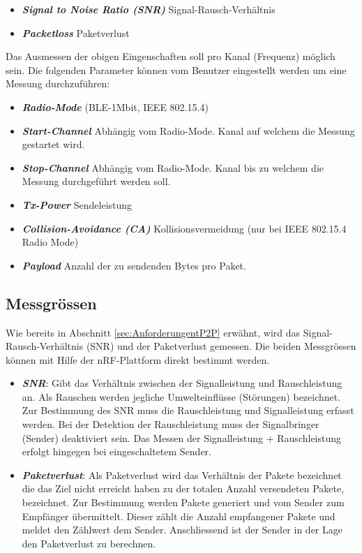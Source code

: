 \begin{itemize}
	\item \textit{\textbf{Signal to Noise Ratio (SNR)}} Signal-Rausch-Verhältnis 
	\item \textit{\textbf{Packetloss}} Paketverlust
\end{itemize}

Das Ausmessen der obigen Eingenschaften soll pro Kanal (Frequenz) möglich sein. Die folgenden Parameter können vom Benutzer eingestellt werden um eine Messung durchzuführen:

\begin{itemize}
	\item \textit{\textbf{Radio-Mode}} (BLE-1Mbit, IEEE 802.15.4)
	\item \textit{\textbf{Start-Channel}} Abhängig vom Radio-Mode. Kanal auf welchem die Messung gestartet wird.
	\item \textit{\textbf{Stop-Channel}} Abhängig vom Radio-Mode. Kanal bis zu welchem die Messung durchgeführt werden soll. 
	\item \textit{\textbf{Tx-Power}} Sendeleistung
	\item \textit{\textbf{Collision-Avoidance (CA)}} Kollisionsvermeidung (nur bei IEEE 802.15.4 Radio Mode)
	\item \textit{\textbf{Payload}} Anzahl der zu sendenden Bytes pro Paket.
\end{itemize}


\subsection{Messgrössen}\label{sec:MessgrössenP2P}
Wie bereits in Abschnitt \ref{sec:AnforderungentP2P} erwähnt, wird das Signal-Rausch-Verhältnis (SNR) und der Paketverlust gemessen. Die beiden Messgrössen können mit Hilfe der nRF-Plattform direkt bestimmt werden.

\begin{itemize}
	\item \textbf{\textit{SNR}}: Gibt das Verhältnis zwischen der Signalleistung und Rauschleistung an. Als Rauschen werden jegliche Umwelteinflüsse (Störungen) bezeichnet. Zur Bestimmung des SNR muss die Rauschleistung und Signalleistung erfasst werden. Bei der Detektion der Rauschleistung muss der Signalbringer (Sender) deaktiviert sein. Das Messen der Signalleistung + Rauschleistung erfolgt hingegen bei eingeschaltetem Sender.
	\item \textbf{\textit{Paketverlust}}: Als Paketverlust wird das Verhältnis der Pakete bezeichnet die das Ziel nicht erreicht haben zu der totalen Anzahl versendeten Pakete, bezeichnet. Zur Bestimmung werden Pakete generiert und vom Sender zum Empfänger übermittelt. Dieser zählt die Anzahl empfangener Pakete und meldet den Zählwert dem Sender. Anschliessend ist der Sender in der Lage den Paketverlust zu berechnen. 
\end{itemize} 


